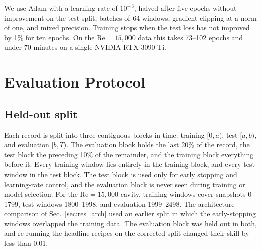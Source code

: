 \documentclass[conf]{new-aiaa}
\newcommand{\Rey}{\mathrm{Re}}
\begin{document}
We use Adam \cite{kingma2015adam} with a learning rate of $10^{-3}$, halved after five epochs without improvement on the test split, batches of 64 windows, gradient clipping at a norm of one, and mixed precision. Training stops when the test loss has not improved by 1\% for ten epochs. On the $\Rey=15{,}000$ data this takes 73--102 epochs and under 70 minutes on a single NVIDIA RTX 3090 Ti.

\section{Evaluation Protocol}
\label{sec:eval}

\subsection{Held-out split}
Each record is split into three contiguous blocks in time: training $[0,a)$, test $[a,b)$, and evaluation $[b,T)$. The evaluation block holds the last 20\% of the record, the test block the preceding 10\% of the remainder, and the training block everything before it. Every training window lies entirely in the training block, and every test window in the test block. The test block is used only for early stopping and learning-rate control, and the evaluation block is never seen during training or model selection. For the $\Rey=15{,}000$ cavity, training windows cover snapshots 0--1799, test windows 1800--1998, and evaluation 1999--2498. The architecture comparison of Sec.~\ref{sec:res_arch} used an earlier split in which the early-stopping windows overlapped the training data. The evaluation block was held out in both, and re-running the headline recipes on the corrected split changed their skill by less than 0.01.
\end{document}

